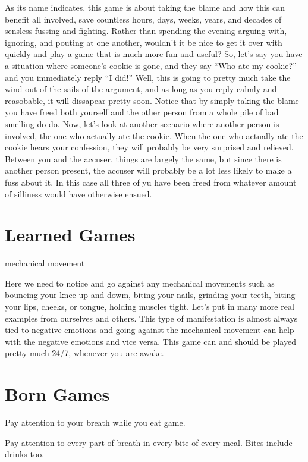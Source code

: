 \documentclass[12pt,letterpaper]{book}
\begin{document}
As its name indicates, this game is about taking the blame and how this can benefit all involved, save countless hours, days, weeks, years, and decades of sensless fussing and fighting. Rather than spending the evening arguing with, ignoring, and pouting at one another, wouldn't it be nice to get it over with quickly and play a game that is much more fun and useful? So, let's say you have a situation where someone's cookie is gone, and they say ``Who ate my cookie?'' and you immediately reply ``I did!'' Well, this is going to pretty much take the wind out of the sails of the argument, and as long as you reply calmly and reasobable, it will dissapear pretty soon. Notice that by simply taking the blame you have freed both yourself and the other person from a whole pile of bad smelling do-do. Now, let's look at another scenario where another person is involved, the one who actually ate the cookie. When the one who actually ate the cookie hears your confession, they will probably be very surprised and relieved. Between you and the accuser, things are largely the same, but since there is another person present, the accuser will probably be a lot less likely to make a fuss about it. In this case all three of yu have been freed from whatever amount of silliness would have otherwise ensued.



\section{Learned Games}

mechanical movement

Here we need to notice and go against any mechanical movements such as bouncing your knee up and dowm, biting your nails, grinding your teeth, biting your lips, cheeks, or tongue, holding muscles tight. Let's put in many more real examples from ourselves and others. This type of manifestation is almost always tied to negative emotions and going against the mechanical movement can help with the negative emotions and vice versa. This game can and should be played pretty much 24/7, whenever you are awake.

\section{Born Games}

Pay attention to your breath while you eat game.

Pay attention to every part of breath in every bite of every meal. Bites include drinks too.
\end{document}
